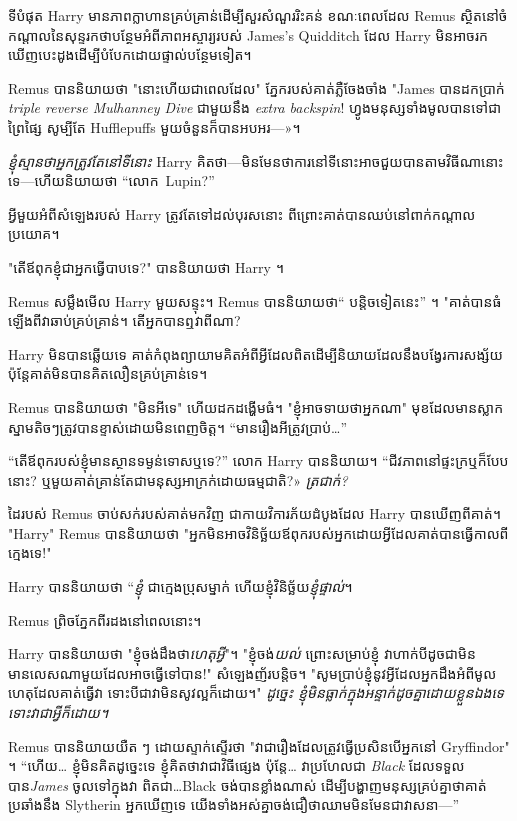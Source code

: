 ទីបំផុត Harry មានភាពក្លាហានគ្រប់គ្រាន់ដើម្បីសួរសំណួររិះគន់ ខណៈពេលដែល Remus ស្ថិតនៅចំកណ្តាលនៃសុន្ទរកថាបន្ថែមអំពីភាពអស្ចារ្យរបស់ James's Quidditch ដែល Harry មិនអាចរកឃើញបេះដូងដើម្បីបំបែកដោយផ្ទាល់បន្ថែមទៀត។

Remus បាននិយាយថា "នោះហើយជាពេលដែល" ភ្នែករបស់គាត់ភ្លឺចែងចាំង "James បានដកប្រាក់ \emph{ triple reverse Mulhanney Dive} ជាមួយនឹង \emph{extra backspin}! ហ្វូង​មនុស្ស​ទាំង​មូល​បាន​ទៅ​ជា​ព្រៃ​ផ្សៃ សូម្បី​តែ Hufflepuffs មួយ​ចំនួន​ក៏​បាន​អបអរ—»។

\emph{ខ្ញុំស្មានថាអ្នកត្រូវតែនៅទីនោះ} Harry គិតថា—មិនមែនថាការនៅទីនោះអាចជួយបានតាមវិធីណានោះទេ—ហើយនិយាយថា “លោក~Lupin?”

អ្វីមួយអំពីសំឡេងរបស់ Harry ត្រូវតែទៅដល់បុរសនោះ ពីព្រោះគាត់បានឈប់នៅពាក់កណ្តាលប្រយោគ។

"តើឪពុកខ្ញុំជាអ្នកធ្វើបាបទេ?" បាននិយាយថា Harry ។

Remus សម្លឹងមើល Harry មួយសន្ទុះ។ Remus បាននិយាយថា“ បន្តិចទៀតនេះ” ។ "គាត់បានធំឡើងពីវាឆាប់គ្រប់គ្រាន់។ តើ​អ្នក​បាន​ឮ​វា​ពី​ណា​?

Harry មិនបានឆ្លើយទេ គាត់កំពុងព្យាយាមគិតអំពីអ្វីដែលពិតដើម្បីនិយាយដែលនឹងបង្វែរការសង្ស័យ ប៉ុន្តែគាត់មិនបានគិតលឿនគ្រប់គ្រាន់ទេ។

Remus បាននិយាយថា "មិនអីទេ" ហើយដកដង្ហើមធំ។ "ខ្ញុំអាចទាយថាអ្នកណា" មុខ​ដែល​មាន​ស្លាក​ស្នាម​តិចៗ​ត្រូវ​បាន​ខ្ទាស់​ដោយ​មិន​ពេញ​ចិត្ត។ “មានរឿងអីត្រូវប្រាប់…”

“តើ​ឪពុក​របស់​ខ្ញុំ​មាន​ស្ថាន​ទម្ងន់​ទោស​ឬ​ទេ?” លោក Harry បាននិយាយ។ “ជីវភាព​នៅ​ផ្ទះ​ក្រ​ឬ​ក៏​បែប​នោះ? ឬមួយគាត់គ្រាន់តែជាមនុស្សអាក្រក់ដោយធម្មជាតិ?» \emph{ត្រជាក់?}

ដៃរបស់ Remus ចាប់សក់របស់គាត់មកវិញ ជាកាយវិការភ័យដំបូងដែល Harry បានឃើញពីគាត់។ "Harry" Remus បាននិយាយថា "អ្នកមិនអាចវិនិច្ឆ័យឪពុករបស់អ្នកដោយអ្វីដែលគាត់បានធ្វើកាលពីក្មេងទេ!"

Harry បាននិយាយថា “\emph{ខ្ញុំ} ជាក្មេងប្រុសម្នាក់ ហើយខ្ញុំវិនិច្ឆ័យ\emph{ខ្ញុំផ្ទាល់}។

Remus ព្រិចភ្នែកពីរដងនៅពេលនោះ។

Harry បាននិយាយថា "ខ្ញុំចង់ដឹងថា\emph{ហេតុអ្វី}"។ "ខ្ញុំចង់\emph{យល់} ព្រោះសម្រាប់ខ្ញុំ វាហាក់បីដូចជាមិនមានលេសណាមួយដែលអាចធ្វើទៅបាន!" សំឡេងញ័របន្តិច។ "សូមប្រាប់ខ្ញុំនូវអ្វីដែលអ្នកដឹងអំពីមូលហេតុដែលគាត់ធ្វើវា ទោះបីជាវាមិនសូវល្អក៏ដោយ។" \emph{ដូច្នេះ ខ្ញុំមិនធ្លាក់ក្នុងអន្ទាក់ដូចគ្នាដោយខ្លួនឯងទេ ទោះវាជាអ្វីក៏ដោយ។}

Remus បាននិយាយយឺត ៗ ដោយស្ទាក់ស្ទើរថា "វាជារឿងដែលត្រូវធ្វើប្រសិនបើអ្នកនៅ Gryffindor" ។ “ហើយ… ខ្ញុំមិនគិតដូច្នេះទេ ខ្ញុំគិតថាវាជាវិធីផ្សេង ប៉ុន្តែ… វាប្រហែលជា \emph{Black} ដែលទទួលបាន\emph{James} ចូលទៅក្នុងវា ពិតជា…Black ចង់បានខ្លាំងណាស់ ដើម្បីបង្ហាញមនុស្សគ្រប់គ្នាថាគាត់ប្រឆាំងនឹង Slytherin អ្នកឃើញទេ យើងទាំងអស់គ្នាចង់ជឿថាឈាមមិនមែនជាវាសនា—”

